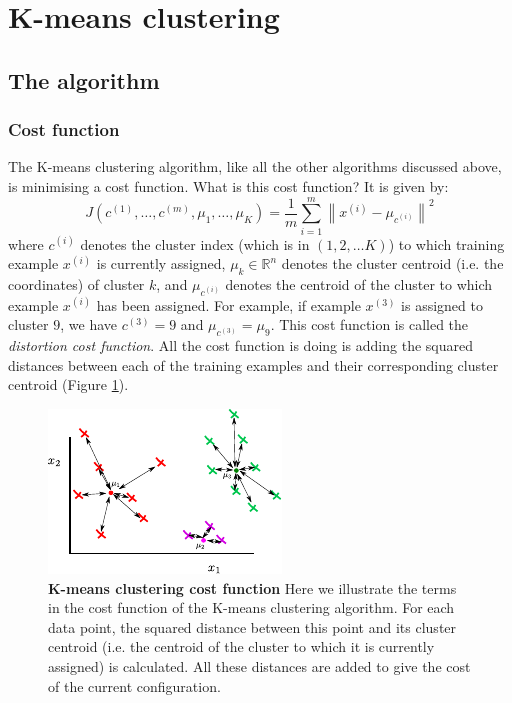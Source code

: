 \documentclass[a4paper, 10pt,hidelinks]{article}
\newcommand{\ind}[1]{^{(#1)}}
\newcommand{\norm}[1]{\left\lVert#1\right\rVert}
\begin{document}
\section{K-means clustering}

\subsection{The algorithm}



\subsubsection{Cost function}
The K-means clustering algorithm, like all the other algorithms discussed above, is minimising a cost function. What is this cost function? It is given by:
\begin{equation}
J(c\ind{1}, \ldots, c\ind{m}, \mu_1, \ldots, \mu_K) = \frac{1}{m} \sum_{i = 1}^m \norm{x\ind{i} - \mu_{c\ind{i}}}^2
\end{equation}
where $c\ind{i}$ denotes the cluster index (which is in $(1, 2, \ldots K)$) to which training example $x\ind{i}$ is currently assigned, $\mu_k \in \mathbb{R}^n$ denotes the cluster centroid (i.e. the coordinates) of cluster $k$, and $\mu_{c\ind{i}}$ denotes the centroid of the cluster to which example $x\ind{i}$ has been assigned. For example, if example $x\ind{3}$ is assigned to cluster $9$, we have $c\ind{3} = 9$ and $\mu_{c\ind{3}} = \mu_9$. This cost function is called the \emph{distortion cost function}. All the cost function is doing is adding the squared distances between each of the training examples and their corresponding cluster centroid (Figure \ref{Fig: K clustering cost}).

\begin{figure}[h!]
\includegraphics[width=0.7\linewidth]{KCluster_Cost}
\caption{\footnotesize{\textbf{K-means clustering cost function} Here we illustrate the terms in the cost function of the K-means clustering algorithm. For each data point, the squared distance between this point and its cluster centroid (i.e. the centroid of the cluster to which it is currently assigned) is calculated. All these distances are added to give the cost of the current configuration. }}
\label{Fig: K clustering cost}
\end{figure}
\end{document}
